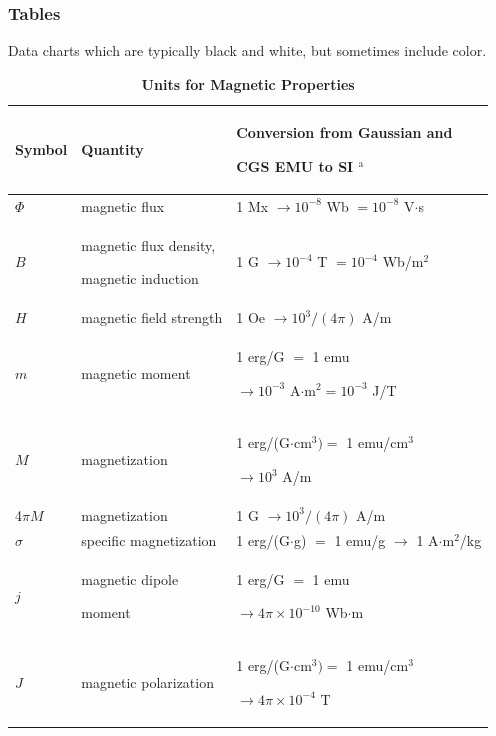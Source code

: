 \documentclass{ieeeaccess}
\begin{document}
\subsubsection{Tables}
{Data charts which are typically black and white, but sometimes include
	color.}

\begin{table}
	\caption{\textbf{Units for Magnetic Properties}}
	\label{table}
	\setlength{\tabcolsep}{3pt}
	\begin{tabular}{|p{25pt}|p{75pt}|p{115pt}|}
		\hline
		Symbol                      &
		Quantity                    &
		Conversion from Gaussian and \par CGS EMU to SI $^{\mathrm{a}}$                                   \\ \hline $\Phi $ & magnetic flux & 1 Mx $\to
		10^{-8}$ Wb $= 10^{-8}$ V$\cdot $s                                                                \\ $B$ & magnetic flux density, \par magnetic induction & 1 G $\to 10^{-4}$ T $= 10^{-4}$ Wb/m$^{2}$ \\ $H$                     &
		magnetic field strength     & 1 Oe $\to 10^{3}/(4\pi )$ A/m                                       \\ $m$    & magnetic
		moment                      & 1 erg/G $=$ 1 emu \par $\to 10^{-3}$ A$\cdot $m$^{2} = 10^{-3}$ J/T \\
		$M$                         &
		magnetization               &
		1 erg/(G$\cdot $cm$^{3}) =$ 1 emu/cm$^{3}$ \par $\to 10^{3}$ A/m                                  \\
		4$\pi M$                    &
		magnetization               &
		1 G $\to  10^{3}/(4\pi )$ A/m                                                                     \\
		$\sigma $                   &
		specific magnetization      &
		1 erg/(G$\cdot $g) $=$ 1 emu/g $\to $ 1 A$\cdot $m$^{2}$/kg                                       \\
		$j$                         &
		magnetic dipole \par moment & 1 erg/G $=$ 1 emu \par $\to 4\pi \times  10^{-10}$ Wb$\cdot $m      \\
		$J$                         &
		magnetic polarization       &
		1 erg/(G$\cdot $cm$^{3}) =$ 1 emu/cm$^{3}$ \par $\to 4\pi \times  10^{-4}$ T                      \\

\end{tabular}
\end{table}
\end{document}
